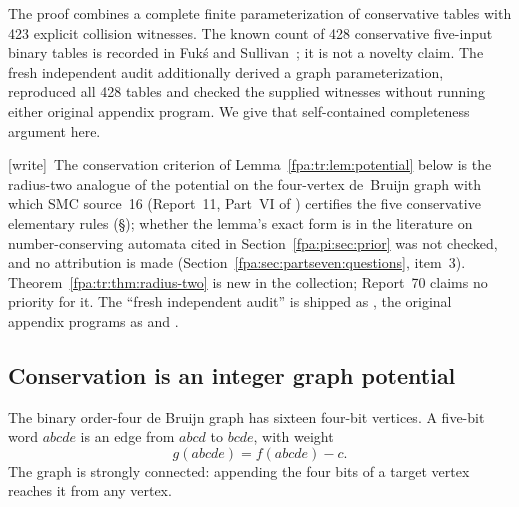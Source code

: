 \documentclass[11pt,a4paper]{article}
\numberwithin{equation}{section}
\newcommand{\wtag}{\textup{[write]}}
\begin{document}
The proof combines a complete finite parameterization of conservative tables with 423 explicit collision witnesses. The known count of 428 conservative five-input binary tables is recorded in Fuk\'s and Sullivan~\cite{fpa:tr:fuks}; it is not a novelty claim. The fresh independent audit additionally derived a graph parameterization, reproduced all 428 tables and checked the supplied witnesses without running either original appendix program. We give that self-contained completeness argument here.

\wtag\ The conservation criterion of Lemma~\ref{fpa:tr:lem:potential} below is the radius-two analogue of the potential on the four-vertex de~Bruijn graph with which SMC source~16 (Report~11, Part~VI of ) certifies the five conservative elementary rules (\S{}); whether the lemma's exact form is in the literature on number-conserving automata cited in Section~\ref{fpa:pi:sec:prior} was not checked, and no attribution is made (Section~\ref{fpa:sec:partseven:questions}, item~3). Theorem~\ref{fpa:tr:thm:radius-two} is new in the collection; Report~70 claims no priority for it. The ``fresh independent audit'' is shipped as , the original appendix programs as  and .

\subsection{Conservation is an integer graph potential}
The binary order-four de Bruijn graph has sixteen four-bit vertices. A five-bit word $abcde$ is an edge from $abcd$ to $bcde$, with weight
\[
g(abcde)=f(abcde)-c.
\]
The graph is strongly connected: appending the four bits of a target vertex reaches it from any vertex.
\end{document}
